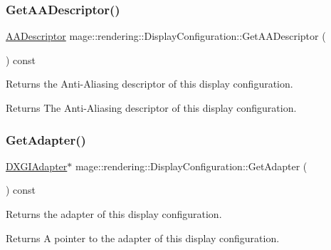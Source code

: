 \subsubsection{\texorpdfstring{Get\+A\+A\+Descriptor()}{GetAADescriptor()}}
{\footnotesize\ttfamily \hyperlink{namespacemage_1_1rendering_a25c189fd1da946d7a8f0abdd4f0e6afa}{A\+A\+Descriptor} mage\+::rendering\+::\+Display\+Configuration\+::\+Get\+A\+A\+Descriptor (\begin{DoxyParamCaption}{ }\end{DoxyParamCaption}) const\hspace{0.3cm}{\ttfamily [noexcept]}}

Returns the Anti-\/\+Aliasing descriptor of this display configuration.

\begin{DoxyReturn}{Returns}
The Anti-\/\+Aliasing descriptor of this display configuration. 
\end{DoxyReturn}
\hypertarget{classmage_1_1rendering_1_1_display_configuration_a8516379377ff3f6cec7b2d705398459f}{}\label{classmage_1_1rendering_1_1_display_configuration_a8516379377ff3f6cec7b2d705398459f} 
\subsubsection{\texorpdfstring{Get\+Adapter()}{GetAdapter()}}
{\footnotesize\ttfamily \hyperlink{namespacemage_1_1rendering_ad55e028ebd705b547eeb972ad8d03b6a}{D\+X\+G\+I\+Adapter}$\ast$ mage\+::rendering\+::\+Display\+Configuration\+::\+Get\+Adapter (\begin{DoxyParamCaption}{ }\end{DoxyParamCaption}) const\hspace{0.3cm}{\ttfamily [noexcept]}}

Returns the adapter of this display configuration.

\begin{DoxyReturn}{Returns}
A pointer to the adapter of this display configuration. 
\end{DoxyReturn}
\hypertarget{classmage_1_1rendering_1_1_display_configuration_a66c6757aa4c17227ab0e7022228f982a}{}\label{classmage_1_1rendering_1_1_display_configuration_a66c6757aa4c17227ab0e7022228f982a} 
